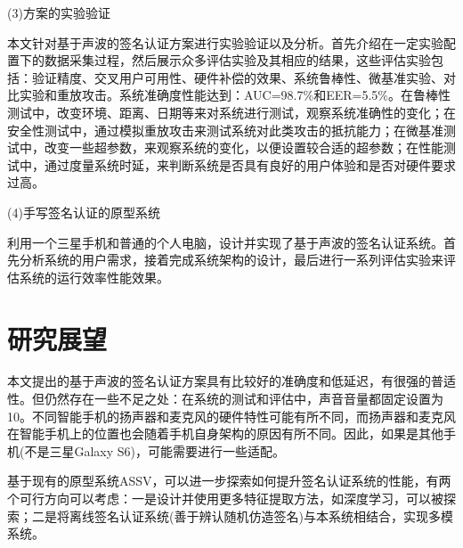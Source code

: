 (3)方案的实验验证

本文针对基于声波的签名认证方案进行实验验证以及分析。首先介绍在一定实验配置下的数据采集过程，然后展示众多评估实验及其相应的结果，这些评估实验包括：验证精度、交叉用户可用性、硬件补偿的效果、系统鲁棒性、微基准实验、对比实验和重放攻击。系统准确度性能达到：AUC=98.7\%和EER=5.5\%。在鲁棒性测试中，改变环境、距离、日期等来对系统进行测试，观察系统准确性的变化；在安全性测试中，通过模拟重放攻击来测试系统对此类攻击的抵抗能力；在微基准测试中，改变一些超参数，来观察系统的变化，以便设置较合适的超参数；在性能测试中，通过度量系统时延，来判断系统是否具有良好的用户体验和是否对硬件要求过高。

(4)手写签名认证的原型系统

利用一个三星手机和普通的个人电脑，设计并实现了基于声波的签名认证系统。首先分析系统的用户需求，接着完成系统架构的设计，最后进行一系列评估实验来评估系统的运行效率性能效果。

\section{研究展望}
本文提出的基于声波的签名认证方案具有比较好的准确度和低延迟，有很强的普适性。但仍然存在一些不足之处：在系统的测试和评估中，声音音量都固定设置为10。不同智能手机的扬声器和麦克风的硬件特性可能有所不同，而扬声器和麦克风在智能手机上的位置也会随着手机自身架构的原因有所不同。因此，如果是其他手机(不是三星Galaxy S6)，可能需要进行一些适配。

基于现有的原型系统ASSV，可以进一步探索如何提升签名认证系统的性能，有两个可行方向可以考虑：一是设计并使用更多特征提取方法，如深度学习，可以被探索；二是将离线签名认证系统(善于辨认随机仿造签名)与本系统相结合，实现多模系统。
